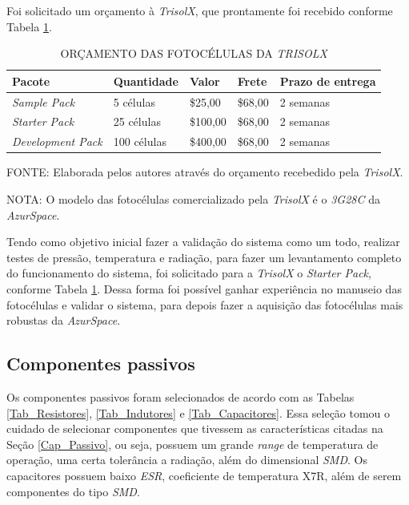 \documentclass[
	12pt,				%
	openright,			%
	oneside,			%
	a4paper,			%
	english,			%
	french,				%
	spanish,			%
	brazil,				%
	oldfontcommands
	]{abntex2}
\begin{document}
	Foi solicitado um orçamento à \textit{TrisolX}, que prontamente foi recebido conforme Tabela \ref{Tab_Orc_TrisolX}.
	
	\begin{table}[th]
	\caption{ORÇAMENTO DAS FOTOCÉLULAS DA \textit{TRISOLX}}
	\label{Tab_Orc_TrisolX}
	\centering
	\begin{tabular}{p{3.5cm}|p{2.5cm}|p{1.5cm}|p{1.5cm}|p{2.0cm}}
		\textbf{Pacote} & \textbf{Quantidade} & \textbf{Valor} & \textbf{Frete} & \textbf{Prazo de entrega}\\
		\hline
		\textit{Sample Pack} & 5 células & \$25,00 &  \$68,00 & 2 semanas\\
		\textit{Starter Pack} & 25 células & \$100,00 &  \$68,00 & 2 semanas\\
		\textit{Development Pack} & 100 células & \$400,00 & \$68,00 & 2 semanas\\
	\end{tabular}
	
	\begin{small}
	\vspace{3pt}
		FONTE: Elaborada pelos autores através do orçamento recebedido pela \textit{TrisolX}.
	\end{small}
	
	\begin{footnotesize}
		NOTA: O modelo das fotocélulas comercializado pela \textit{TrisolX} é o \textit{3G28C} da \textit{AzurSpace}.
	\end{footnotesize}
	\end{table}	
	
	Tendo como objetivo inicial fazer a validação do sistema como um todo, realizar testes de pressão, temperatura e radiação, para fazer um levantamento completo do funcionamento do sistema, foi solicitado para a \textit{TrisolX} o \textit{Starter Pack}, conforme Tabela \ref{Tab_Orc_TrisolX}. Dessa forma foi possível ganhar experiência no manuseio das fotocélulas e validar o sistema, para depois fazer a aquisição das fotocélulas mais robustas da \textit{AzurSpace}.
	
\subsection[Componentes passivos]{Componentes passivos}
	
	Os componentes passivos foram selecionados de acordo com as Tabelas \ref{Tab_Resistores}, \ref{Tab_Indutores} e \ref{Tab_Capacitores}. Essa seleção tomou o cuidado de selecionar componentes que tivessem as características citadas na Seção \ref{Cap_Passivo}, ou seja, possuem um grande \textit{range} de temperatura de operação, uma certa tolerância a radiação, além do dimensional \textit{SMD}. Os capacitores possuem baixo \textit{ESR}, coeficiente de temperatura X7R, além de serem componentes do tipo \textit{SMD}.
	
\end{document}
